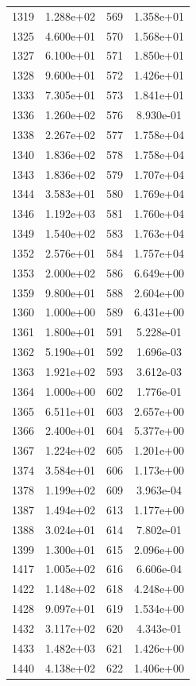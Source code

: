\documentclass[12pt]{article}
\begin{document}
\begin{longtable}{@{}cccc@{}}
1319 & 1.288e+02 & 569 & 1.358e+01 \\
1325 & 4.600e+01 & 570 & 1.568e+01 \\
1327 & 6.100e+01 & 571 & 1.850e+01 \\
1328 & 9.600e+01 & 572 & 1.426e+01 \\
1333 & 7.305e+01 & 573 & 1.841e+01 \\
1336 & 1.260e+02 & 576 & 8.930e-01 \\
1338 & 2.267e+02 & 577 & 1.758e+04 \\
1340 & 1.836e+02 & 578 & 1.758e+04 \\
1343 & 1.836e+02 & 579 & 1.707e+04 \\
1344 & 3.583e+01 & 580 & 1.769e+04 \\
1346 & 1.192e+03 & 581 & 1.760e+04 \\
1349 & 1.540e+02 & 583 & 1.763e+04 \\
1352 & 2.576e+01 & 584 & 1.757e+04 \\
1353 & 2.000e+02 & 586 & 6.649e+00 \\
1359 & 9.800e+01 & 588 & 2.604e+00 \\
1360 & 1.000e+00 & 589 & 6.431e+00 \\
1361 & 1.800e+01 & 591 & 5.228e-01 \\
1362 & 5.190e+01 & 592 & 1.696e-03 \\
1363 & 1.921e+02 & 593 & 3.612e-03 \\
1364 & 1.000e+00 & 602 & 1.776e-01 \\
1365 & 6.511e+01 & 603 & 2.657e+00 \\
1366 & 2.400e+01 & 604 & 5.377e+00 \\
1367 & 1.224e+02 & 605 & 1.201e+00 \\
1374 & 3.584e+01 & 606 & 1.173e+00 \\
1378 & 1.199e+02 & 609 & 3.963e-04 \\
1387 & 1.494e+02 & 613 & 1.177e+00 \\
1388 & 3.024e+01 & 614 & 7.802e-01 \\
1399 & 1.300e+01 & 615 & 2.096e+00 \\
1417 & 1.005e+02 & 616 & 6.606e-04 \\
1422 & 1.148e+02 & 618 & 4.248e+00 \\
1428 & 9.097e+01 & 619 & 1.534e+00 \\
1432 & 3.117e+02 & 620 & 4.343e-01 \\
1433 & 1.482e+03 & 621 & 1.426e+00 \\
1440 & 4.138e+02 & 622 & 1.406e+00 \\

\end{longtable}
\end{document}
